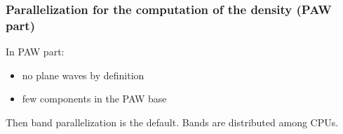 \begin{frame}
  \frametitle{Parallelization for the computation of the density (PAW part)}
  In PAW part:
  \begin{itemize}
    \item no plane waves by definition
    \item few components in the PAW base
  \end{itemize}
  Then band parallelization is the default. Bands are distributed among CPUs.
\end{frame}
